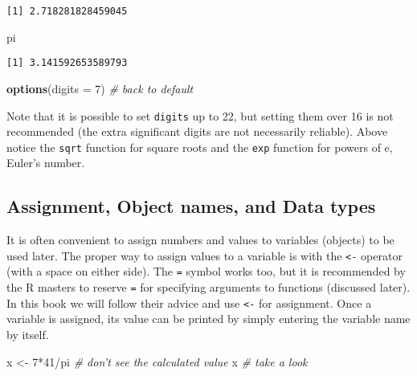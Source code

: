 \documentclass[]{book}
\newenvironment{Shaded}{\begin{snugshade}}{\end{snugshade}}
\newcommand{\KeywordTok}[1]{\textcolor[rgb]{0.13,0.29,0.53}{\textbf{{#1}}}}
\newcommand{\DataTypeTok}[1]{\textcolor[rgb]{0.13,0.29,0.53}{{#1}}}
\newcommand{\DecValTok}[1]{\textcolor[rgb]{0.00,0.00,0.81}{{#1}}}
\newcommand{\StringTok}[1]{\textcolor[rgb]{0.31,0.60,0.02}{{#1}}}
\newcommand{\CommentTok}[1]{\textcolor[rgb]{0.56,0.35,0.01}{\textit{{#1}}}}
\newcommand{\NormalTok}[1]{{#1}}
\numberwithin{equation}{chapter}
\numberwithin{figure}{chapter}
\theoremstyle{plain}
\theoremstyle{definition}
\theoremstyle{remark}
\theoremstyle{definition}
\theoremstyle{definition}
\theoremstyle{remark}
\begin{document}
\begin{verbatim}
[1] 2.718281828459045
\end{verbatim}

\begin{Shaded}
\begin{Highlighting}[]
\NormalTok{pi       }
\end{Highlighting}
\end{Shaded}

\begin{verbatim}
[1] 3.141592653589793
\end{verbatim}

\begin{Shaded}
\begin{Highlighting}[]
\KeywordTok{options}\NormalTok{(}\DataTypeTok{digits =} \DecValTok{7}\NormalTok{)  }\CommentTok{# back to default}
\end{Highlighting}
\end{Shaded}

Note that it is possible to set \texttt{digits} up to 22, but setting
them over 16 is not recommended (the extra significant digits are not
necessarily reliable). Above notice the \texttt{sqrt} function for
square roots and the \texttt{exp}  function for
powers of \(\mathrm{e}\), Euler's number.

\subsection{Assignment, Object names, and Data
types}\label{sub-Assignment-Object-names}

It is often convenient to assign numbers and values to variables
(objects) to be used later. The proper way to assign values to a
variable is with the \texttt{\textless{}-} operator (with a space on
either side). The \texttt{=} symbol works too, but it is recommended by
the R masters to reserve \texttt{=} for specifying arguments to
functions (discussed later). In this book we will follow their advice
and use \texttt{\textless{}-} for assignment. Once a variable is
assigned, its value can be printed by simply entering the variable name
by itself.

\begin{Shaded}
\begin{Highlighting}[]
\NormalTok{x <-}\StringTok{ }\DecValTok{7}\NormalTok{*}\DecValTok{41}\NormalTok{/pi   }\CommentTok{# don't see the calculated value}
\NormalTok{x              }\CommentTok{# take a look}
\end{Highlighting}
\end{Shaded}
\end{document}
